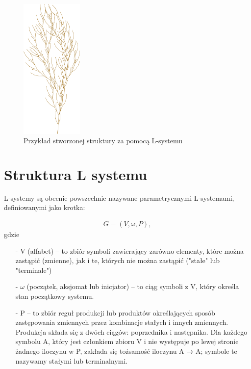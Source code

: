 \documentclass[a4paper,12pt,oneside]{book} %
\begin{document}
\begin{figure}[h]
	\centering\includegraphics[height=7cm]{L-system-fractal.svg.png}
	\caption{Przykład stworzonej struktury za pomocą L-systemu}
    \label{fig:lsystreeexample}
\end{figure}

\section{Struktura L systemu}


L-systemy są obecnie powszechnie nazywane parametrycznymi L-systemami, definiowanymi jako krotka:

\begin{gather}
	G = (V, \omega, P),
\end{gather}
gdzie

\begin{itemize}
	\item[-] V (alfabet) -- to zbiór symboli zawierający zarówno elementy, które można zastąpić (zmienne), jak i te, których nie można zastąpić ("stałe" lub "terminale")
	\item[-] \(\omega\) (początek, aksjomat lub inicjator) -- to ciąg symboli z V, który określa stan początkowy systemu.
	\item[-] P  -- to zbiór reguł produkcji lub produktów określających sposób zastępowania zmiennych przez kombinacje stałych i innych zmiennych. Produkcja składa się z dwóch ciągów: poprzednika i następnika. Dla każdego symbolu A, który jest członkiem zbioru V i nie występuje po lewej stronie żadnego iloczynu w P, zakłada się tożsamość iloczynu A → A; symbole te nazywamy stałymi lub terminalnymi.
\end{itemize}
\end{document}
